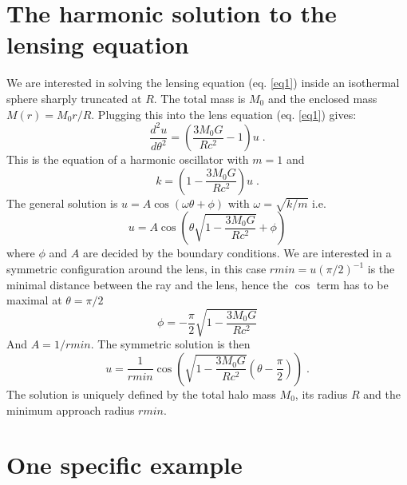 \documentclass{article}
\begin{document}
\section{The harmonic solution to the lensing equation}

We are interested in solving the lensing equation (eq. \ref{eq1}) inside an isothermal sphere sharply truncated at $R$. The total mass is $M_0$ and the enclosed mass $M(r)=M_0r/R$. Plugging this into the lens equation (eq. \ref{eq1}) gives:
\begin{equation}
    \label{eq5}
    \frac{d^2u}{d\theta^2}=\left( \frac{3M_0G}{Rc^2} -1 \right) u \;.
\end{equation}
This is the equation of a harmonic oscillator with $m=1$ and
\begin{equation}
    \label{eq6}
    k=\left( 1-\frac{3M_0G}{Rc^2} \right) u \;.
\end{equation}
The general solution is $u=A\cos \left( \omega \theta+\phi \right)$ with $\omega=\sqrt{k/m}$ i.e.
\begin{equation}
    \label{eq7}
    u= A \cos \left( \theta\sqrt{1-\frac{3M_0G}{Rc^2}} +\phi \right)
\end{equation}
where $\phi$ and $A$ are decided by the boundary conditions. We are interested in a symmetric configuration around the lens, in this case $rmin=u(\pi/2)^{-1}$ is the minimal distance between the ray and the lens, hence the $\cos$ term has to be maximal at $\theta=\pi/2$ 
\begin{equation}
    \label{eq8}
    \phi = -\frac{\pi}{2}\sqrt{1-\frac{3M_0G}{Rc^2}}
\end{equation}
And $A=1/rmin$. The symmetric solution is then 
\begin{equation}
    \label{eq9}
    u= \frac{1}{rmin} \cos \left( \sqrt{1-\frac{3M_0G}{Rc^2}} \left( \theta-\frac{\pi}{2}\right) \right)\;.
\end{equation}
The solution is uniquely defined by the total halo mass $M_0$, its radius $R$ and the minimum approach radius $rmin$.

\section{One specific example}
\end{document}
